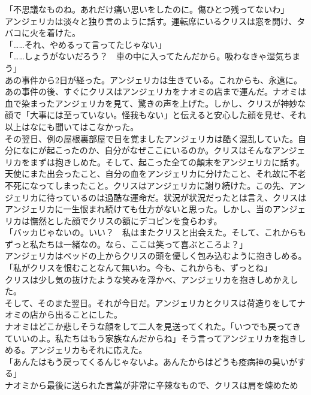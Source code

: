 \documentclass[b5j,10pt,openany]{jsbook}
\begin{document}
「不思議なものね。あれだけ痛い思いをしたのに。傷ひとつ残ってないわ」\\アンジェリカは淡々と独り言のように話す。運転席にいるクリスは窓を開け、タバコに火を着けた。\\「\ldots{}\ldots{}それ、やめるって言ってたじゃない」\\「\ldots{}\ldots{}しょうがないだろう？　車の中に入ってたんだから。吸わなきゃ湿気ちまう」\\あの事件から2日が経った。アンジェリカは生きている。これからも、永遠に。\\あの事件の後、すぐにクリスはアンジェリカをナオミの店まで運んだ。ナオミは血で染まったアンジェリカを見て、驚きの声を上げた。しかし、クリスが神妙な顔で「大事には至っていない。怪我もない」と伝えると安心した顔を見せ、それ以上はなにも聞いてはこなかった。\\その翌日、例の屋根裏部屋で目を覚ましたアンジェリカは酷く混乱していた。自分になにが起こったのか、自分がなぜここにいるのか。クリスはそんなアンジェリカをまずは抱きしめた。そして、起こった全ての顛末をアンジェリカに話す。天使にまた出会ったこと、自分の血をアンジェリカに分けたこと、それ故に不老不死になってしまったこと。クリスはアンジェリカに謝り続けた。この先、アンジェリカに待っているのは過酷な運命だ。状況が状況だったとは言え、クリスはアンジェリカに一生恨まれ続けても仕方がないと思った。しかし、当のアンジェリカは憮然とした顔でクリスの額にデコピンを食らわす。\\「バッカじゃないの。いい？　私はまたクリスと出会えた。そして、これからもずっと私たちは一緒なの。なら、ここは笑って喜ぶところよ？」\\アンジェリカはベッドの上からクリスの頭を優しく包み込むように抱きしめる。\\「私がクリスを恨むことなんて無いわ。今も、これからも、ずっとね」\\クリスは少し気の抜けたような笑みを浮かべ、アンジェリカを抱きしめかえした。\\そして、そのまた翌日。それが今日だ。アンジェリカとクリスは荷造りをしてナオミの店から出ることにした。\\ナオミはどこか悲しそうな顔をして二人を見送ってくれた。「いつでも戻ってきていいのよ。私たちはもう家族なんだからね」そう言ってアンジェリカを抱きしめる。アンジェリカもそれに応えた。\\「あんたはもう戻ってくるんじゃないよ。あんたからはどうも疫病神の臭いがする」\\ナオミから最後に送られた言葉が非常に辛辣なもので、クリスは肩を竦めため
\end{document}
